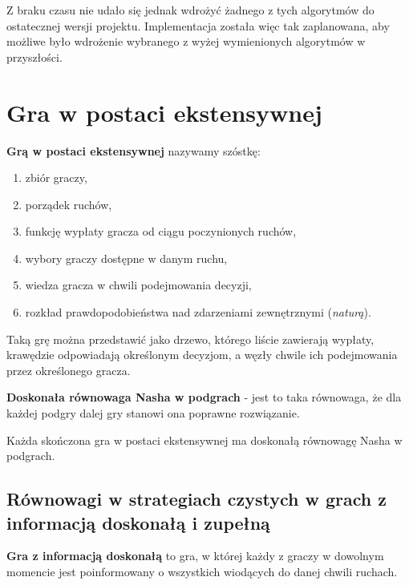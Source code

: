 \documentclass[polish]{standalone}
\begin{document}
Z braku czasu nie udało się jednak wdrożyć żadnego z tych algorytmów do ostatecznej wersji projektu. Implementacja
została więc tak zaplanowana, aby możliwe było wdrożenie wybranego z wyżej wymienionych algorytmów w przyszłości.

\section{Gra w postaci ekstensywnej}

\begin{definition}
\textbf{Grą w postaci ekstensywnej} nazywamy szóstkę:
\begin{enumerate}
\item zbiór graczy,
\item porządek ruchów,
\item funkcję wypłaty gracza od ciągu poczynionych ruchów,
\item wybory graczy dostępne w danym ruchu,
\item wiedza gracza w chwili podejmowania decyzji,
\item rozkład prawdopodobieństwa nad zdarzeniami zewnętrznymi (\textit{naturą}).
\end{enumerate}
\cite[str.~77--78]{FT-GT}
\end{definition}

Taką grę można przedstawić jako drzewo, którego liście zawierają wypłaty, krawędzie odpowiadają określonym decyzjom,
a węzły chwile ich podejmowania przez określonego gracza. 

\begin{definition}
\textbf{Doskonała równowaga Nasha w podgrach} - jest to taka równowaga, że dla każdej podgry dalej gry stanowi ona
poprawne rozwiązanie.
\end{definition}

\begin{theorem}
Każda skończona gra w postaci ekstensywnej ma doskonałą równowagę Nasha w podgrach.
\end{theorem}

\subsection{Równowagi w strategiach czystych w grach z informacją doskonałą i zupełną}

\begin{definition}
\textbf{Gra z informacją doskonałą} to gra, w której każdy z graczy w dowolnym momencie jest poinformowany o wszystkich
wiodących do danej chwili ruchach.
\end{definition}
\end{document}
